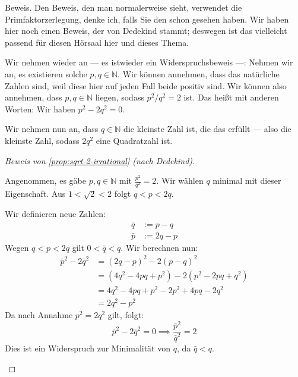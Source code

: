 \begin{math-stroke}
\end{math-stroke}

\begin{spoken-clean}[00:43:12 - 00:45:42]
Beweis. Den Beweis, den man normalerweise sieht, verwendet die Primfaktorzerlegung, denke ich, falls Sie den schon gesehen haben. Wir haben hier noch einen Beweis, der von Dedekind stammt; deswegen ist das vielleicht passend für diesen Hörsaal hier und dieses Thema.

Wir nehmen wieder an --- es istwieder ein Widerspruchsbeweis ---: Nehmen wir an, es existieren solche $p, q \in \mathbb{N}$. Wir können annehmen, dass das natürliche Zahlen sind, weil diese hier auf jeden Fall beide positiv sind. Wir können also annehmen, dass $p, q \in \mathbb{N}$ liegen, sodass $p^2 / q^2 = 2$ ist. Das heißt mit anderen Worten: Wir haben $p^2 - 2q^2 = 0$.

Wir nehmen nun an, dass $q \in \mathbb{N}$ die kleinste Zahl ist, die das erfüllt --- also die kleinste Zahl, sodass $2q^2$ eine Quadratzahl ist.
\end{spoken-clean}

\begin{proof}[Beweis von \cref{prop:sqrt-2-irrational} (nach Dedekind)]
\begin{math-stroke}
Angenommen, es gäbe $p, q \in \mathbb{N}$ mit $\frac{p^2}{q^2} = 2$. Wir wählen $q$ minimal mit dieser Eigenschaft. Aus $1 < \sqrt{2} < 2$ folgt $q < p < 2q$.

Wir definieren neue Zahlen:
\begin{align}
\bar{q} &:= p - q \label{eq:q-bar} \\
\bar{p} &:= 2q - p \label{eq:p-bar}
\end{align}
Wegen $q < p < 2q$ gilt $0 < \bar{q} < q$. Wir berechnen nun:
\begin{align*}
\bar{p}^2 - 2\bar{q}^2 &= (2q - p)^2 - 2(p - q)^2 \\
&= (4q^2 - 4pq + p^2) - 2(p^2 - 2pq + q^2) \\
&= 4q^2 - 4pq + p^2 - 2p^2 + 4pq - 2q^2 \\
&= 2q^2 - p^2
\end{align*}
Da nach Annahme $p^2 = 2q^2$ gilt, folgt:
\[ \bar{p}^2 - 2\bar{q}^2 = 0 \implies \frac{\bar{p}^2}{\bar{q}^2} = 2 \]
Dies ist ein Widerspruch zur Minimalität von $q$, da $\bar{q} < q$.
\end{math-stroke}
\end{proof}

